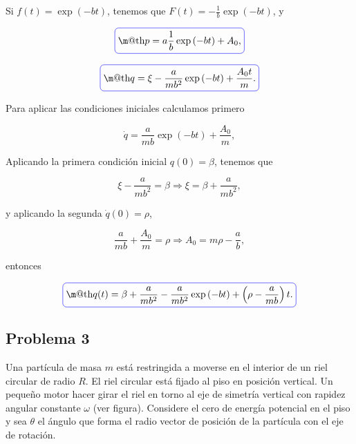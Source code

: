 \documentclass[a4paper,10pt]{article}
\makeatletter
\numberwithin{equation}{section}
\newcommand*{\boxcolor}{blue}
\renewcommand{\boxed}[1]{\textcolor{\boxcolor}{%
\tikz[baseline={([yshift=-1ex]current bounding box.center)}] \node [rectangle, minimum width=1ex,rounded corners,draw] {\normalcolor\m@th$\displaystyle#1$};}}
\makeatother
\begin{document}
Si $f(t) = \exp{(-bt)}$, tenemos que $F(t) = - \frac{1}{b}\exp{(-bt)}$, y 

\begin{equation}
 \boxed{p = a\frac{1}{b}\exp{(-bt)} + A_0,}
\end{equation}

\begin{equation}
 \boxed{q = \xi - \frac{a}{mb^2}\exp{(-bt)} + \frac{A_0t}{m}.}
\end{equation}

Para aplicar las condiciones iniciales calculamos primero

\begin{equation}
 \dot{q} = \frac{a}{mb}\exp{(-bt)} + \frac{A_0}{m},
\end{equation}

Aplicando la primera condición inicial $q(0) = \beta$, tenemos que 

\begin{equation}
 \xi - \frac{a}{mb^2} = \beta \Rightarrow \xi = \beta + \frac{a}{mb^2},
\end{equation}

y aplicando la segunda $\dot{q}(0) = \rho$, 

\begin{equation}
\frac{a}{mb} + \frac{A_0}{m} = \rho \Rightarrow A_0 = m\rho - \frac{a}{b}, 
\end{equation}

entonces 

\begin{equation}
 \boxed{q(t) = \beta + \frac{a}{mb^2} - \frac{a}{mb^2}\exp{(-bt)} + 
 \left(\rho - \frac{a}{mb} \right)t.}
\end{equation}

\subsection{Problema 3}

Una partícula de masa $m$ está restringida a moverse en el interior de un riel circular 
de radio $R$. El riel circular está fijado al piso en posición vertical. Un pequeño 
motor hacer girar el riel en torno al eje de simetría vertical con rapidez angular 
constante $\omega$ (ver figura). Considere el cero de energía potencial en el piso y 
sea $\theta$ el ángulo que forma el radio vector de posición de la partícula con el 
eje de rotación.
\end{document}

